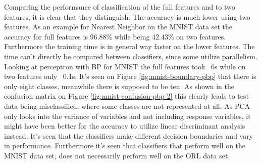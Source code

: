 Comparing the performance of classification of the full features and to two features, it is clear that they distinguish. The accuracy is much lower using two features. As an example for Nearest Neighbor on the MNIST data set the accuracy for full features is 96.88\% while being 42.43\% on two features. Furthermore the training time is in general way faster on the lower features. The time can't directly be compared between classifiers, since some utilize parallelism. Looking at perceptron with BP for MNIST the full features took ~6s while on two features only ~0.1s. It's seen on Figure \ref{fig:mnist-boundary-pbp} that there is only eight classes, meanwhile there is supposed to be ten. As shown in the confusion matrix on Figure \ref{fig:mnist-confusion-pbp-2} this clearly leads to test data being misclassified, where some classes are not represented at all. As PCA only looks into the variance of variables and not including response variables, it might have been better for the accuracy to utilize linear discriminant analysis instead. It's seen that the classifiers make different decision boundaries and vary in performance. Furthermore it's seen that classifiers that perform well on the MNIST data set, does not necessarily perform well on the ORL data set. 